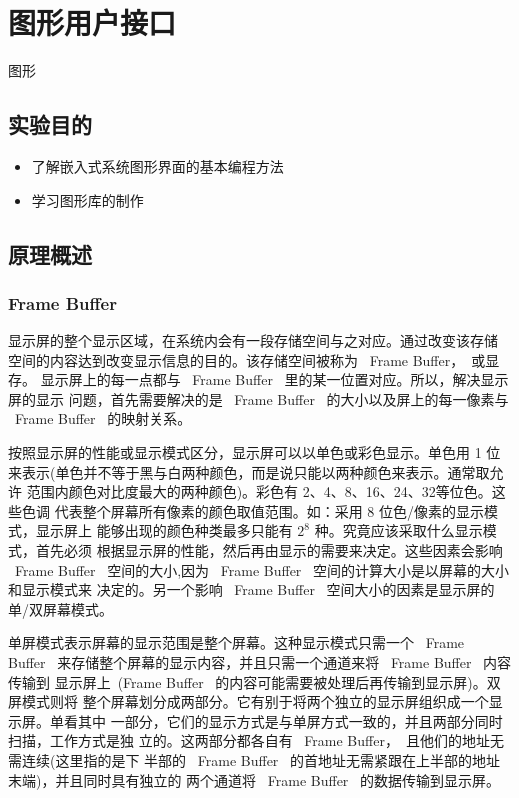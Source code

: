 \chapter{图形用户接口}{图形}

\section{实验目的}
\begin{itemize}
  \item 了解嵌入式系统图形界面的基本编程方法
  \item 学习图形库的制作
\end{itemize}

\section{原理概述}
\subsection{Frame Buffer}
	显示屏的整个显示区域，在系统内会有一段存储空间与之对应。通过改变该存储
空间的内容达到改变显示信息的目的。该存储空间被称为 ~Frame Buffer，~或显存。
显示屏上的每一点都与 ~Frame Buffer~ 里的某一位置对应。所以，解决显示屏的显示
问题，首先需要解决的是 ~Frame Buffer~ 的大小以及屏上的每一像素与 ~Frame
Buffer~ 的映射关系。

	按照显示屏的性能或显示模式区分，显示屏可以以单色或彩色显示。单色用 1 位
来表示(单色并不等于黑与白两种颜色，而是说只能以两种颜色来表示。通常取允许
范围内颜色对比度最大的两种颜色)。彩色有 2、4、8、16、24、32等位色。这些色调
代表整个屏幕所有像素的颜色取值范围。如：采用 8 位色/像素的显示模式，显示屏上
能够出现的颜色种类最多只能有 $2^8$ 种。究竟应该采取什么显示模式，首先必须
根据显示屏的性能，然后再由显示的需要来决定。这些因素会影响 ~Frame Buffer~
空间的大小,因为 ~Frame Buffer~ 空间的计算大小是以屏幕的大小和显示模式来
决定的。另一个影响 ~Frame Buffer~ 空间大小的因素是显示屏的单/双屏幕模式。

	单屏模式表示屏幕的显示范围是整个屏幕。这种显示模式只需一个 ~Frame Buffer~
来存储整个屏幕的显示内容，并且只需一个通道来将 ~Frame Buffer~ 内容传输到
显示屏上~(Frame Buffer~ 的内容可能需要被处理后再传输到显示屏)。双屏模式则将
整个屏幕划分成两部分。它有别于将两个独立的显示屏组织成一个显示屏。单看其中
一部分，它们的显示方式是与单屏方式一致的，并且两部分同时扫描，工作方式是独
立的。这两部分都各自有 ~Frame Buffer，~且他们的地址无需连续(这里指的是下
半部的 ~Frame Buffer~ 的首地址无需紧跟在上半部的地址末端)，并且同时具有独立的
两个通道将 ~Frame Buffer~ 的数据传输到显示屏。

